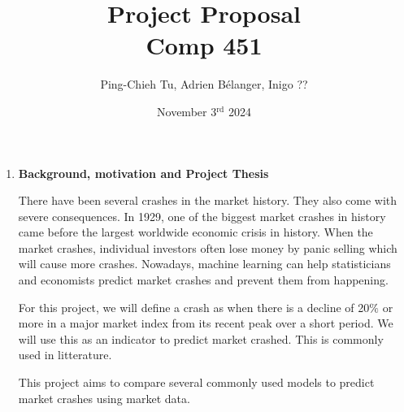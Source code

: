 \documentclass[12pt, letterpaper]{article}
\title{
  Project Proposal \\
  \Large Comp 451}
\author{Ping-Chieh Tu, Adrien Bélanger, Inigo ??}
\date{November 3$^{\text{rd}}$ 2024}
\begin{document}
\maketitle 

\begin{enumerate}[label=]
    \item \textbf{Background, motivation and Project Thesis}

    There have been several crashes in the market history. They also come with severe consequences. In 1929, one of the biggest market crashes in history came before the largest worldwide economic crisis in history. When the market crashes, individual investors often lose money by panic selling which will cause more crashes. Nowadays, machine learning can help statisticians and economists predict market crashes and prevent them from happening.

    For this project, we will define a crash as when there is a decline of 20$\%$ or more in a major market index from its recent peak over a short period. We will use this as an indicator to predict market crashed. This is commonly used in litterature.
    
   


    This project aims to compare several commonly used models to predict market crashes using market data.
    

\end{enumerate}
\end{document}
